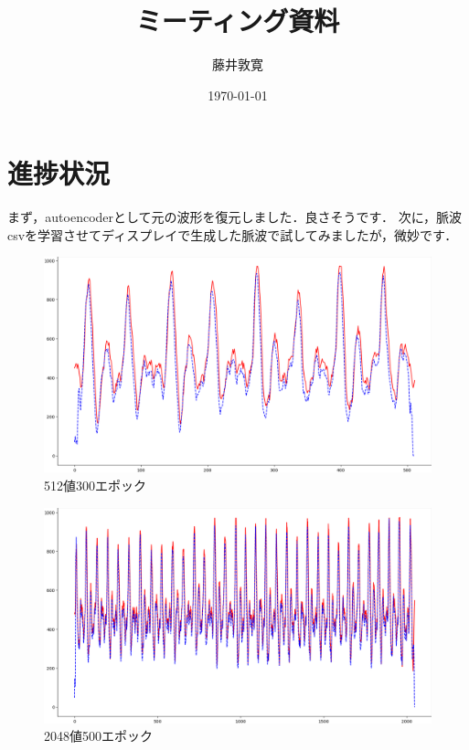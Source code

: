 \documentclass[a4j,10pt]{jarticle}
\title{ミーティング資料}
\author{藤井敦寛}
\date{\today}
\begin{document}
\maketitle

\section{進捗状況}
まず，autoencoderとして元の波形を復元しました．良さそうです．
次に，脈波csvを学習させてディスプレイで生成した脈波で試してみましたが，微妙です．


\begin{figure}[h]
  \begin{center}
    \includegraphics[width=1\textwidth]{../research/pulse/figure/512_autoencoder_300epoch.png}
    \caption{512値300エポック}
    \label{fig1}
  \end{center}
\end{figure}

\begin{figure}[h]
  \begin{center}
    \includegraphics[width=1\textwidth]{../research/pulse/figure/2048_autoencoder_500epoch.png}
    \caption{2048値500エポック}
    \label{fig2}
  \end{center}
\end{figure}
\end{document}
